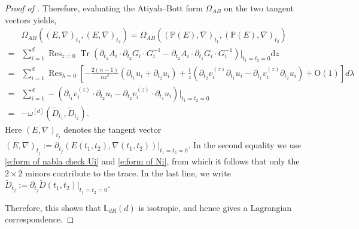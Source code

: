 \documentclass[10pt,a4paper]{amsart}
\begin{document}
\begin{proof}[Proof of ]
Therefore, evaluating the Atiyah--Bott form $\Omega_{AB}$ on the two
tangent vectors yields,
\begin{align*}
&\Omega_{AB} \left( (E,\nabla)_{t_1}, ( E,\nabla)_{t_2}\right)
= \Omega_{AB} \left( (\mathbb{P}(E),\nabla)_{t_1}, ( \mathbb{P}(E),\nabla)_{t_2}\right) \\
=& 
\sum_{i=1}^d \operatorname{Res}_{z=0} \operatorname{Tr}\left(
    \partial_{t_1} A_i \cdot \partial_{t_2} G_i
    \cdot G_i^{-1}
    - \partial_{t_2} A_i \cdot \partial_{t_1} G_i
    \cdot G_i^{-1}
\right) \Big|_{t_1=t_2=0} \mathrm{d}z \\
=& \sum_{i=1}^d \operatorname{Res}_{\lambda = 0} 
\left[
    -\frac{2(n-1)}{n z^2} \left( \partial_{t_1}u_i + \partial_{t_2}u_i \right)
    + 
    \frac{1}{z} \left( \partial_{t_2} v^{(z)}_i \partial_{t_1} u_i - \partial_{t_1} v^{(z)}_i \partial_{t_2} u_i \right)
    + 
    \mathrm{O}(1)
\right] d\lambda \\
=& \sum_{i=1}^d -\left(
    \partial_{t_1} v^{(z)}_i \cdot \partial_{t_2} u_i
    - \partial_{t_2} v^{(z)}_i \cdot \partial_{t_1} u_i
\right) \Big|_{t_1=t_2=0}\\
=& -\omega^{[d]} \left( \widetilde{D}_{t_1}, \widetilde{D}_{t_2} \right).
\end{align*}
Here $(E,\nabla)_{t_j}$ denotes the tangent vector
\(
(E,\nabla)_{t_j}
:=\partial_{t_j}(E(t_1,t_2),\nabla(t_1,t_2))\Big|_{t_1=t_2=0}.
\)
In the second equality we use \eqref{e:form of nabla check Ui} and
\eqref{e:form of Ni}, from which it follows that only the $2\times2$ minors
contribute to the trace.
In the last line, we write
\(
\widetilde D_{t_j}
:=\partial_{t_j}\widetilde D(t_1,t_2)\Big|_{t_1=t_2=0}.
\)

Therefore, this shows that $\mathbb L_{dR}(d)$ is isotropic, and hence gives a Lagrangian correspondence.
\end{proof}
\end{document}
